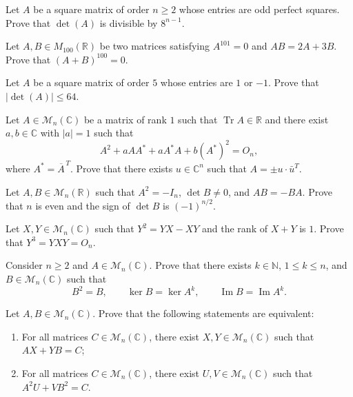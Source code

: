 \documentclass[12pt]{article}
\begin{document}
\begin{problem}
Let $A$ be a square matrix of order $n\geq 2$ whose entries are odd perfect squares. Prove that $\det(A)$ is divisible by $8^{n-1}$.
\end{problem}

\begin{problem}
Let $A,B\in M_{100}(\mathbb{R})$ be two matrices satisfying $A^{101}=0$ and $AB=2A+3B$. Prove that $(A+B)^{100}=0$.
\end{problem}

\begin{problem}
Let $A$ be a square matrix of order $5$ whose entries are $1$ or $-1$. Prove that $|\det(A)|\leq 64$.
\end{problem}

\begin{problem}
Let $A \in \mathcal{M}_n(\mathbb{C})$ be a matrix of rank $1$ such that $\operatorname{Tr} A \in \mathbb{R}$ and there exist $a,b\in\mathbb{C}$ with $|a|=1$ such that
\[
A^2 + aAA^* + a A^*A + b(A^*)^2 = O_n,
\]
where $A^* = \overline{A}^{\,T}$. Prove that there exists $u \in \mathbb{C}^n$ such that $A = \pm u\cdot \bar u^T$.
\end{problem}

\begin{problem}
Let $A, B \in \mathcal{M}_n(\mathbb{R})$ such that $A^2 = -I_n$, $\det B \ne 0$, and $AB = -BA$. Prove that $n$ is even and the sign of $\det B$ is $(-1)^{n/2}$.
\end{problem}

\begin{problem}
Let $X, Y \in \mathcal{M}_n(\mathbb{C})$ such that $Y^2 = YX - XY$ and the rank of $X+Y$ is $1$. Prove that $Y^3 = YXY = O_n$.
\end{problem}

\begin{problem}
Consider $n \ge 2$ and $A \in \mathcal{M}_n(\mathbb{C})$. Prove that there exists $k \in \mathbb{N}$, $1 \le k \le n$, and $B \in \mathcal{M}_n(\mathbb{C})$ such that
\[
B^2 = B, \qquad \ker B = \ker A^k, \qquad \operatorname{Im} B = \operatorname{Im} A^k.
\]
\end{problem}

\begin{problem}
Let $A, B \in \mathcal{M}_n(\mathbb{C})$. Prove that the following statements are equivalent:
\begin{enumerate}[label=\arabic*)]
\item For all matrices $C \in \mathcal{M}_n(\mathbb{C})$, there exist $X,Y \in \mathcal{M}_n(\mathbb{C})$ such that $AX+YB=C$;
\item For all matrices $C \in \mathcal{M}_n(\mathbb{C})$, there exist $U,V \in \mathcal{M}_n(\mathbb{C})$ such that $A^2U+VB^2=C$.
\end{enumerate}
\end{problem}
\end{document}
